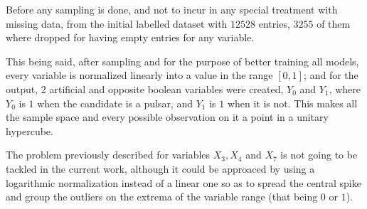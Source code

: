 Before any sampling is done, and not to incur in any special treatment with
missing data, from the initial labelled dataset with $12528$ entries, $3255$ of
them where dropped for having empty entries for any variable. 

This being said, after sampling and for the purpose of better training all
models, every variable is normalized linearly into a value in the range $[0,1]$;
and for the output, 2 artificial and opposite boolean variables were created,
$Y_0$ and $Y_1$, where $Y_0$ is $1$ when the candidate is a pulsar, and $Y_1$ is
$1$ when it is not. This makes all the sample space and every possible
observation on it a point in a unitary hypercube.

The problem previously described for variables $X_3, X_4$ and $X_7$ is not going
to be tackled in the current work, although it could be approaced by using a
logarithmic normalization instead of a linear one so as to spread the central
spike and group the outliers on the extrema of the variable range (that being
$0$ or $1$).